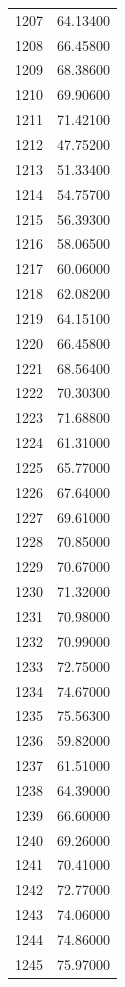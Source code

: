 \documentclass[
  letterpaper,
  DIV=11,
  numbers=noendperiod]{scrreprt}
\begin{document}
\begin{tcolorbox}
\begin{tabular}{lr}
1207 &         64.13400 \\
1208 &         66.45800 \\
1209 &         68.38600 \\
1210 &         69.90600 \\
1211 &         71.42100 \\
1212 &         47.75200 \\
1213 &         51.33400 \\
1214 &         54.75700 \\
1215 &         56.39300 \\
1216 &         58.06500 \\
1217 &         60.06000 \\
1218 &         62.08200 \\
1219 &         64.15100 \\
1220 &         66.45800 \\
1221 &         68.56400 \\
1222 &         70.30300 \\
1223 &         71.68800 \\
1224 &         61.31000 \\
1225 &         65.77000 \\
1226 &         67.64000 \\
1227 &         69.61000 \\
1228 &         70.85000 \\
1229 &         70.67000 \\
1230 &         71.32000 \\
1231 &         70.98000 \\
1232 &         70.99000 \\
1233 &         72.75000 \\
1234 &         74.67000 \\
1235 &         75.56300 \\
1236 &         59.82000 \\
1237 &         61.51000 \\
1238 &         64.39000 \\
1239 &         66.60000 \\
1240 &         69.26000 \\
1241 &         70.41000 \\
1242 &         72.77000 \\
1243 &         74.06000 \\
1244 &         74.86000 \\
1245 &         75.97000 \\

\end{tabular}
\end{tcolorbox}
\end{document}
